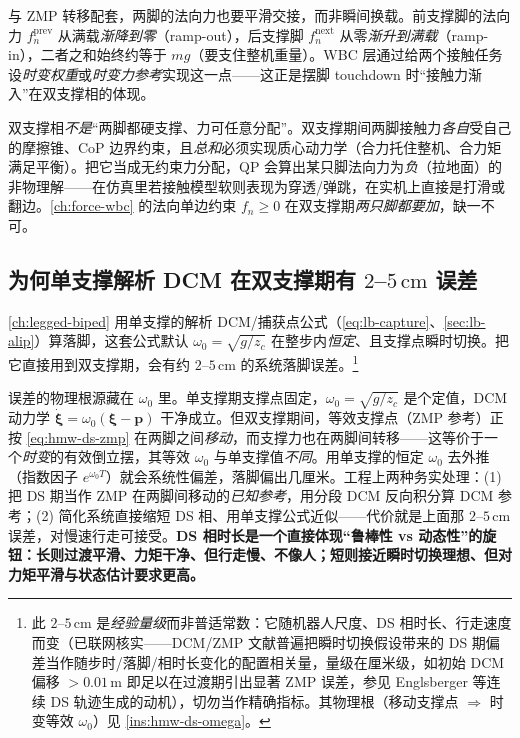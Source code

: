 与 ZMP 转移配套，两脚的法向力也要平滑交接，而非瞬间换载。前支撑脚的法向力 $f_n^{\mathrm{prev}}$ 从满载\emph{渐降到零}（ramp-out），后支撑脚 $f_n^{\mathrm{next}}$ 从零\emph{渐升到满载}（ramp-in），二者之和始终约等于 $mg$（要支住整机重量）。WBC 层通过给两个接触任务设\emph{时变权重}或\emph{时变力参考}实现这一点——这正是摆脚 touchdown 时“接触力渐入”在双支撑相的体现。

\begin{pitfall}\label{pit:hmw-ds-force-free}
双支撑相\emph{不是}“两脚都硬支撑、力可任意分配”。双支撑期间两脚接触力\emph{各自}受自己的摩擦锥、CoP 边界约束，且\emph{总和}必须实现质心动力学（合力托住整机、合力矩满足平衡）。把它当成无约束力分配，QP 会算出某只脚法向力为\emph{负}（拉地面）的非物理解——在仿真里若接触模型软则表现为穿透/弹跳，在实机上直接是打滑或翻边。\cref{ch:force-wbc} 的法向单边约束 $f_n\ge 0$ 在双支撑期\emph{两只脚都要加}，缺一不可。
\end{pitfall}

\subsection{为何单支撑解析 DCM 在双支撑期有 \texorpdfstring{$2$--$5\,\mathrm{cm}$}{2-5cm} 误差}
\label{subsec:hmw-ds-omega}

\cref{ch:legged-biped} 用单支撑的解析 DCM/捕获点公式（\cref{eq:lb-capture}、\cref{sec:lb-alip}）算落脚，这套公式默认 $\omega_0=\sqrt{g/z_c}$ 在整步内\emph{恒定}、且支撑点瞬时切换。把它直接用到双支撑期，会有约 $2$–$5\,\mathrm{cm}$ 的系统落脚误差。\footnote{此 $2$–$5\,\mathrm{cm}$ 是\emph{经验量级}而非普适常数：它随机器人尺度、DS 相时长、行走速度而变（已联网核实——DCM/ZMP 文献普遍把瞬时切换假设带来的 DS 期偏差当作随步时/落脚/相时长变化的配置相关量，量级在厘米级，如初始 DCM 偏移 $>0.01\,\mathrm m$ 即足以在过渡期引出显著 ZMP 误差，参见 Englsberger 等连续 DS 轨迹生成的动机\cite{englsberger2015dcm}），切勿当作精确指标。其物理根（移动支撑点 $\Rightarrow$ 时变等效 $\omega_0$）见 \cref{ins:hmw-ds-omega}。}

\begin{insight}\label{ins:hmw-ds-omega}
误差的物理根源藏在 $\omega_0$ 里。单支撑期支撑点固定，$\omega_0=\sqrt{g/z_c}$ 是个定值，DCM 动力学 $\dot{\boldsymbol\xi}=\omega_0(\boldsymbol\xi-\mathbf p)$ 干净成立。但双支撑期间，等效支撑点（ZMP 参考）正按 \cref{eq:hmw-ds-zmp} 在两脚之间\emph{移动}，而支撑力也在两脚间转移——这等价于一个\emph{时变}的有效倒立摆，其等效 $\omega_0$ 与单支撑值\emph{不同}。用单支撑的恒定 $\omega_0$ 去外推（指数因子 $e^{\omega_0 T}$）就会系统性偏差，落脚偏出几厘米。工程上两种务实处理：(1) 把 DS 期当作 ZMP 在两脚间移动的\emph{已知参考}，用分段 DCM 反向积分算 DCM 参考；(2) 简化系统直接缩短 DS 相、用单支撑公式近似——代价就是上面那 $2$–$5\,\mathrm{cm}$ 误差，对慢速行走可接受。\textbf{DS 相时长是一个直接体现“鲁棒性 vs 动态性”的旋钮：长则过渡平滑、力矩干净、但行走慢、不像人；短则接近瞬时切换理想、但对力矩平滑与状态估计要求更高。}
\end{insight}


